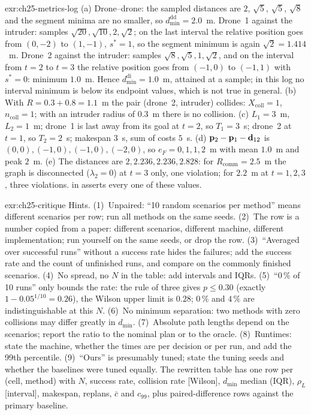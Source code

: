 \begin{solution}{exr:ch25-metrics-log}
(a) Drone--drone: the sampled distances are $2$, $\sqrt5$, $\sqrt5$, $\sqrt8$ and the segment minima are no smaller, so $d_{\min}^{\mathrm{dd}} = 2.0$~m. Drone~1 against the intruder: samples $\sqrt{20}, \sqrt{10}, 2, \sqrt2$; on the last interval the relative position goes from $(0,-2)$ to $(1,-1)$, $s^* = 1$, so the segment minimum is again $\sqrt2 = 1.414$~m. Drone~2 against the intruder: samples $\sqrt8, \sqrt5, 1, \sqrt2$, and on the interval from $t=2$ to $t=3$ the relative position goes from $(-1,0)$ to $(-1,1)$ with $s^* = 0$: minimum $1.0$~m. Hence $d_{\min}^{\mathrm{di}} = 1.0$~m, attained at a sample; in this log no interval minimum is below its endpoint values, which is not true in general. (b) With $R = 0.3 + 0.8 = 1.1$~m the pair (drone~2, intruder) collides: $X_{\mathrm{coll}} = 1$, $n_{\mathrm{coll}} = 1$; with an intruder radius of $0.3$~m there is no collision. (c) $L_1 = 3$~m, $L_2 = 1$~m; drone~1 is last away from its goal at $t = 2$, so $T_1 = 3$~s; drone~2 at $t = 1$, so $T_2 = 2$~s; makespan $3$~s, sum of costs $5$~s. (d) $\mathbf{p}_2 - \mathbf{p}_1 - \mathbf{d}_{12}$ is $(0,0), (-1,0), (-1,0), (-2,0)$, so $e_F = 0, 1, 1, 2$~m with mean $1.0$~m and peak $2$~m. (e) The distances are $2, 2.236, 2.236, 2.828$: for $R_{\mathrm{comm}} = 2.5$~m the graph is disconnected ($\lambda_2 = 0$) at $t = 3$ only, one violation; for $2.2$~m at $t = 1, 2, 3$, three violations.  in  asserts every one of these values.
\end{solution}

\begin{solution}{exr:ch25-critique}
Hints. (1)~Unpaired: ``10 random scenarios per method'' means different scenarios per row; run all methods on the same seeds. (2)~The \orca row is a number copied from a paper: different scenarios, different machine, different implementation; run \orca yourself on the same seeds, or drop the row. (3)~``Averaged over successful runs'' without a success rate hides the failures; add the success rate and the count of unfinished runs, and compare on the commonly finished scenarios. (4)~No spread, no $N$ in the table: add intervals and IQRs. (5)~``$0\,\%$ of 10 runs'' only bounds the rate: the rule of three gives $p \le 0.30$ (exactly $1 - 0.05^{1/10} = 0.26$), the Wilson upper limit is $0.28$; $0\,\%$ and $4\,\%$ are indistinguishable at this $N$. (6)~No minimum separation: two methods with zero collisions may differ greatly in $d_{\min}$. (7)~Absolute path lengths depend on the scenarios; report the ratio to the nominal plan or to the oracle. (8)~Runtimes: state the machine, whether the times are per decision or per run, and add the 99th percentile. (9)~``Ours'' is presumably tuned; state the tuning seeds and whether the baselines were tuned equally. The rewritten table has one row per (cell, method) with $N$, success rate, collision rate [Wilson], $d_{\min}$ median (IQR), $\rho_L$ [interval], makespan, replans, $\bar c$ and $c_{99}$, plus paired-difference rows against the primary baseline.
\end{solution}

